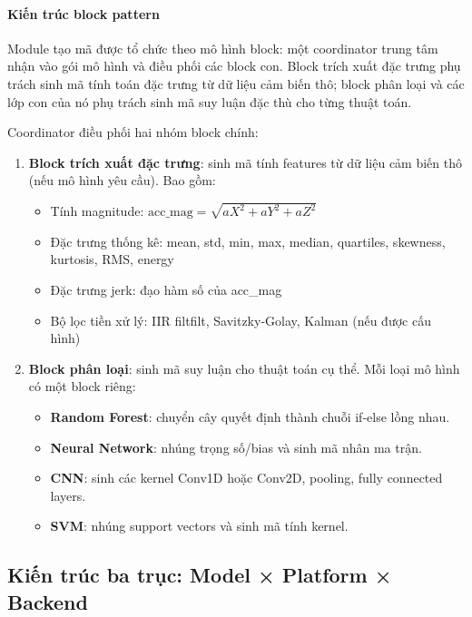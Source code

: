 \paragraph{Kiến trúc block pattern}
Module tạo mã được tổ chức theo mô hình block: một coordinator trung tâm nhận vào gói mô hình và điều phối các block con. Block trích xuất đặc trưng phụ trách sinh mã tính toán đặc trưng từ dữ liệu cảm biến thô; block phân loại và các lớp con của nó phụ trách sinh mã suy luận đặc thù cho từng thuật toán.

Coordinator điều phối hai nhóm block chính:
\begin{enumerate}
    \item \textbf{Block trích xuất đặc trưng}: sinh mã tính features từ dữ liệu cảm biến thô (nếu mô hình yêu cầu). Bao gồm:
    \begin{itemize}
        \item Tính magnitude: $\text{acc\_mag} = \sqrt{aX^2 + aY^2 + aZ^2}$
        \item Đặc trưng thống kê: mean, std, min, max, median, quartiles, skewness, kurtosis, RMS, energy
        \item Đặc trưng jerk: đạo hàm số của acc\_mag
        \item Bộ lọc tiền xử lý: IIR filtfilt, Savitzky-Golay, Kalman (nếu được cấu hình)
    \end{itemize}
    
    \item \textbf{Block phân loại}: sinh mã suy luận cho thuật toán cụ thể. Mỗi loại mô hình có một block riêng:
    \begin{itemize}
        \item \textbf{Random Forest}: chuyển cây quyết định thành chuỗi if-else lồng nhau.
        \item \textbf{Neural Network}: nhúng trọng số/bias và sinh mã nhân ma trận.
        \item \textbf{CNN}: sinh các kernel Conv1D hoặc Conv2D, pooling, fully connected layers.
        \item \textbf{SVM}: nhúng support vectors và sinh mã tính kernel.
    \end{itemize}
\end{enumerate}

\subsection{Kiến trúc ba trục: Model × Platform × Backend}
\label{subsec:three_axis_architecture}

